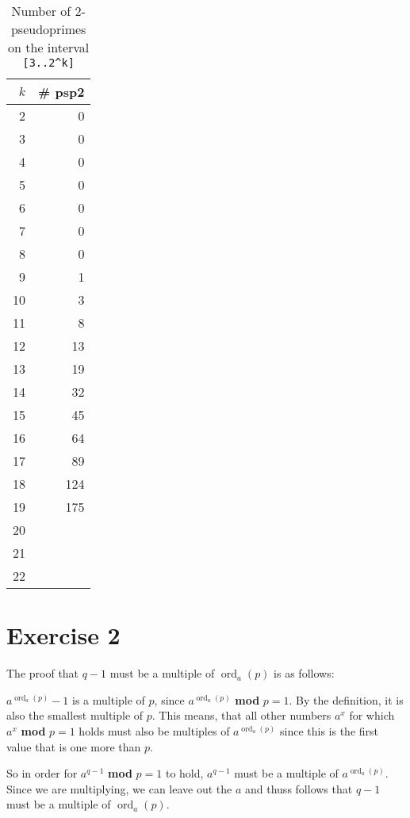 \documentclass[a4paper]{article}
\DeclareMathOperator*{\ord}{ord}
\begin{document}
\begin{table}[h]
	\centering
	\caption{Number of 2-pseudoprimes on the interval \lstinline{[3..2^k]}}
	\label{tbl:exe}
	\begin{tabular}{r|r}
		$k$  & \# psp2 \\
		\hline
		2  & 0   \\
		3  & 0   \\
		4  & 0   \\
		5  & 0   \\
		6  & 0   \\
		7  & 0   \\
		8  & 0   \\
		9  & 1   \\
		10 & 3   \\
		11 & 8   \\
		12 & 13  \\
		13 & 19  \\
		14 & 32  \\
		15 & 45  \\
		16 & 64  \\
		17 & 89  \\
		18 & 124 \\
		19 & 175 \\
		20 &     \\
		21 &     \\
		22 &     \\
	\end{tabular}
\end{table}



\section*{Exercise 2}


The proof that $q-1$ must be a multiple of $\ord_a(p)$ is as follows:

$a^{\ord_a(p)} - 1$ is a multiple of $p$, since $a^{\ord_a(p)}$ \textbf{mod} $p=1$. By the definition, it is also the smallest multiple of $p$. This means, that all other numbers $a^x$ for which $a^x$ \textbf{mod} $p=1$ holds must also be multiples of $a^{\ord_a(p)}$ since this is the first value that is one more than $p$. 

So in order for $a^{q-1}$ \textbf{mod} $p=1$ to hold, $a^{q-1}$ must be a multiple of $a^{\ord_a(p)}$. Since we are multiplying, we can leave out the $a$ and thuss follows that $q-1$ must be a multiple of $\ord_a(p)$. 
\end{document}
